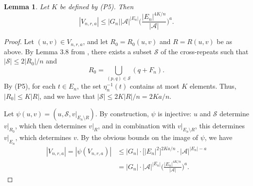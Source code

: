 \documentclass[12pt]{amsart}
\newtheorem{lemma}[theorem]{Lemma}
\theoremstyle{definition}
\begin{document}
\begin{lemma} \label{Lemma:BooNRA}
Let $K$ be defined by (P5). Then
\begin{equation*}
|V_{n,r,a}| \leq |G_n| |\mathcal{A}|^{|E_n|} \biggl( \frac{ |E_n|^{4K/n} }{|\mathcal{A}|} \biggr)^a.
\end{equation*}
\end{lemma}
\begin{proof}
Let $(u,v) \in V_{n,r,a}$, and let $R_0 = R_0(u,v)$ and $R = R(u,v)$ be as above. 
By Lemma 3.8 from \cite{McGoffPavlov}, there exists a subset $\mathcal{S}$ of the cross-repeats such that $|\mathcal{S}| \leq 2 |R_0| /n$ and
\begin{equation*}
R_0 = \bigcup_{(p,q) \in \mathcal{S}} (q+F_n).
\end{equation*}
By (P5), for each $t \in E_n$, the set $\eta_n^{-1}(t)$ contains at most $K$ elements. Thus, $|R_0| \leq K |R|$, and we have that $|\mathcal{S}| \leq 2K |R| / n = 2K a/n$.

Let $\psi(u,v) = (u, \mathcal{S}, v|_{E_n \setminus R})$. By construction, $\psi$ is injective: $u$ and $\mathcal{S}$ determine $v|_{R_0}$, which then determines $v|_{R}$, and in combination with $v|_{E_n \setminus R}$, this determines $v|_{E_n}$, which determines $v$. By the obvious bounds on the image of $\psi$, we have
\begin{align*}
|V_{n,r,a}| = | \psi(V_{n,r,a}) | & \leq |G_n| \cdot \bigl[|E_n|^2 \bigr]^{2K a/n} \cdot |\mathcal{A}|^{|E_n|-a} \\
& =  |G_n| \cdot |\mathcal{A}|^{|E_n|} \biggl( \frac{ |E_n|^{4K/n} }{|\mathcal{A}|} \biggr)^a.
\end{align*}
\end{proof}

\end{document}
